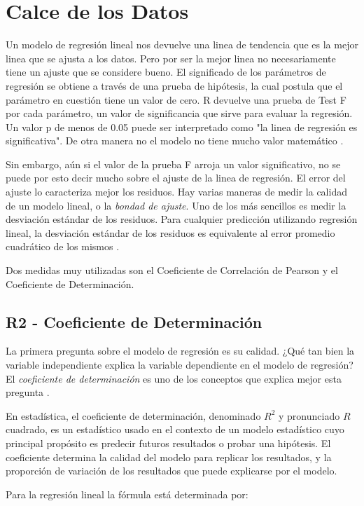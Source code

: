 \documentclass[letterpaper, spanish, 11pt]{report}
\begin{document}
\section{Calce de los Datos}
Un modelo de regresión lineal nos devuelve una linea de tendencia que es la mejor linea que se ajusta a los datos. Pero por ser la mejor linea no necesariamente tiene un ajuste que se considere bueno. El significado de los parámetros de regresión se obtiene a través de una prueba de hipótesis, la cual postula que el parámetro en cuestión tiene un valor de cero. R devuelve una prueba de Test F por cada parámetro, un valor de significancia que sirve para evaluar la regresión. Un valor p de menos de 0.05 puede ser interpretado como "la linea de regresión es significativa". De otra manera no el modelo no tiene mucho valor matemático \cite{daroczi}.

Sin embargo, aún si el valor de la prueba F arroja un valor significativo, no se puede por esto decir mucho sobre el ajuste de la linea de regresión. El error del ajuste lo caracteriza mejor los residuos. Hay varias maneras de medir la calidad de un modelo lineal, o la \emph{bondad de ajuste}. Uno de los más sencillos es medir la desviación estándar de los residuos. Para cualquier predicción utilizando regresión lineal, la desviación estándar de los residuos es equivalente al error promedio cuadrático de los mismos \cite{thinkStats}. 

Dos medidas muy utilizadas son el Coeficiente de Correlación de Pearson y el Coeficiente de Determinación.  

\subsection{R2 - Coeficiente de Determinación}
La primera pregunta sobre el modelo de regresión es su calidad. ¿Qué tan bien la variable independiente explica la variable dependiente en el modelo de regresión? El \emph{coeficiente de determinación} es uno de los conceptos que explica mejor esta pregunta \cite{intoStats7}.

En estadística, el coeficiente de determinación, denominado $R^2$ y pronunciado $R$ cuadrado, es un estadístico usado en el contexto de un modelo estadístico cuyo principal propósito es predecir futuros resultados o probar una hipótesis. El coeficiente determina la calidad del modelo para replicar los resultados, y la proporción de variación de los resultados que puede explicarse por el modelo.

Para la regresión lineal la fórmula está determinada por:
\end{document}
